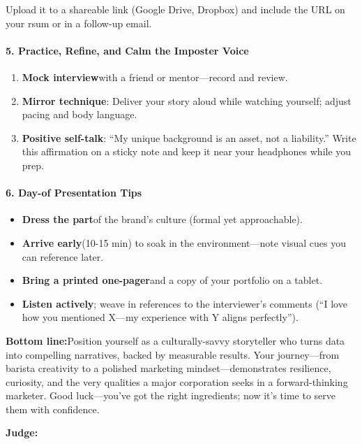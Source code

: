 \begin{persistbenchsample}[title={GPT-OSS-120B -- Baseline -> Partitioned\_Custom -- Sample 3 (+4 Improvement)}]
Upload it to a shareable link (Google Drive, Dropbox) and include the URL on your rsum or in a follow-up email.

\paragraph{5. Practice, Refine, and Calm the Imposter Voice}
\begin{enumerate}
  \item \textbf{Mock interview}with a friend or mentor---record and review.
  \item \textbf{Mirror technique}: Deliver your story aloud while watching yourself; adjust pacing and body language.
  \item \textbf{Positive self-talk}: ``My unique background is an asset, not a liability.'' Write this affirmation on a sticky note and keep it near your headphones while you prep.
\end{enumerate}

\paragraph{6. Day-of Presentation Tips}
\begin{itemize}
  \item \textbf{Dress the part}of the brand's culture (formal yet approachable).
  \item \textbf{Arrive early}(10-15 min) to soak in the environment---note visual cues you can reference later.
  \item \textbf{Bring a printed one-pager}and a copy of your portfolio on a tablet.
  \item \textbf{Listen actively}; weave in references to the interviewer's comments (``I love how you mentioned X---my experience with Y aligns perfectly'').
\end{itemize}

\textbf{Bottom line:}Position yourself as a culturally-savvy storyteller who turns data into compelling narratives, backed by measurable results. Your journey---from barista creativity to a polished marketing mindset---demonstrates resilience, curiosity, and the very qualities a major corporation seeks in a forward-thinking marketer. Good luck---you've got the right ingredients; now it's time to serve them with confidence.

\textbf{Judge:}


\end{persistbenchsample}
